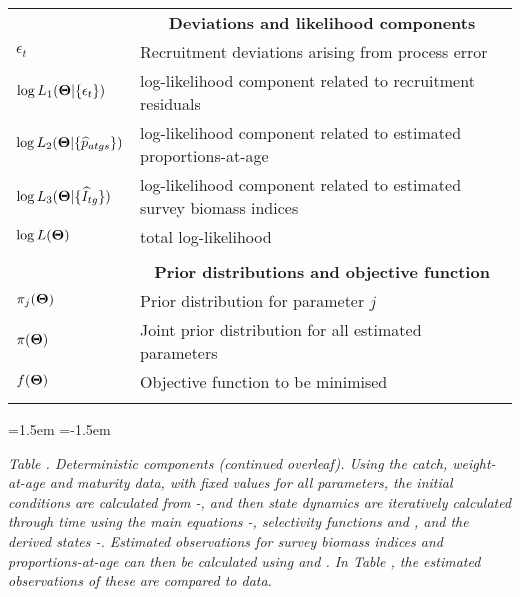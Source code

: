 \begin{tabular}{ll}
\\[-.5ex]
& \multicolumn{1}{c}{{\bf Deviations and likelihood components}} \\
$\epsilon_t$ & Recruitment deviations arising from process error\\
$\log L_1({\bf \Theta} | \{ \epsilon_t \}) $ & log-likelihood component related to recruitment residuals\\
$\log L_2({\bf \Theta} | \{ \widehat{p}_{atgs} \} )$ & log-likelihood component related to estimated proportions-at-age\\
$\log L_3({\bf \Theta} | \{ \widehat{I}_{tg} \} )$ &  log-likelihood component related to estimated survey biomass indices \\
$\log L({\bf \Theta})$ & total log-likelihood \\
\\[-.5ex]
& \multicolumn{1}{c}{{\bf Prior distributions and objective function}} \\
$\pi_j({\bf \Theta})$ & Prior distribution for parameter $j$ \\
$\pi({\bf \Theta})$ & Joint prior distribution for all estimated parameters\\
$f({\bf \Theta})$ & Objective function to be minimised\\
 & \\
\hline
\end{tabular} \newp %





\def\bec{ \begin{center} \hspace{-15ex}}
\def\eec{\end{center} \vspace{-1ex}}

\leftskip=1.5em	   %
\parindent=-1.5em  %

{\it Table . Deterministic components (continued overleaf). Using the catch, weight-at-age and maturity data, with fixed values for all parameters, the initial conditions are calculated from -, and then state dynamics are iteratively calculated through time using the main equations -, selectivity functions  and , and the derived states -. Estimated observations for survey biomass indices and proportions-at-age can then be calculated using  and . In Table , the estimated observations of these are compared to data.}%

